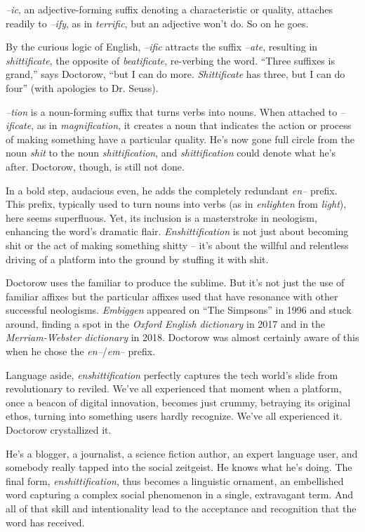 \textit{--ic}, an adjective-forming suffix denoting a characteristic or quality, attaches readily to \textit{--ify}, as in \textit{terrific}, but an adjective won't do. So on he goes.

By the curious logic of English, \textit{--ific} attracts the suffix \textit{--ate}, resulting in \textit{shittificate}, the opposite of \textit{beatificate}, re-verbing the word. ``Three suffixes is grand,'' says Doctorow, ``but I can do more. \textit{Shittificate} has three, but I can do four'' (with apologies to Dr. Seuss).

\textit{--tion} is a noun-forming suffix that turns verbs into nouns. When attached to \textit{--ificate}, as in \textit{magnification}, it creates a noun that indicates the action or process of making something have a particular quality. He's now gone full circle from the noun \textit{shit} to the noun \textit{shittification}, and \textit{shittification} could denote what he's after. Doctorow, though, is still not done.

In a bold step, audacious even, he adds the completely redundant \textit{en--} prefix. This prefix, typically used to turn nouns into verbs (as in \textit{enlighten} from \textit{light}), here seems superfluous. Yet, its inclusion is a masterstroke in neologism, enhancing the word's dramatic flair. \textit{Enshittification} is not just about becoming shit or the act of making something shitty -- it's about the willful and relentless driving of a platform into the ground by stuffing it with shit.

Doctorow uses the familiar to produce the sublime. But it's not just the use of familiar affixes but the particular affixes used that have resonance with other successful neologisms. \textit{Embiggen} appeared on ``The Simpsons'' in 1996 and stuck around, finding a spot in the \textit{Oxford English dictionary} in 2017 and in the \textit{Merriam-Webster dictionary} in 2018. Doctorow was almost certainly aware of this when he chose the \textit{en--}/\textit{em--} prefix.

Language aside, \textit{enshittification} perfectly captures the tech world's slide from revolutionary to reviled. We've all experienced that moment when a platform, once a beacon of digital innovation, becomes just crummy, betraying its original ethos, turning into something users hardly recognize. We've all experienced it. Doctorow crystallized it.

He's a blogger, a journalist, a science fiction author, an expert language user, and somebody really tapped into the social zeitgeist. He knows what he's doing. The final form, \textit{enshittification}, thus becomes a linguistic ornament, an embellished word capturing a complex social phenomenon in a single, extravagant term. And all of that skill and intentionality lead to the acceptance and recognition that the word has received.

